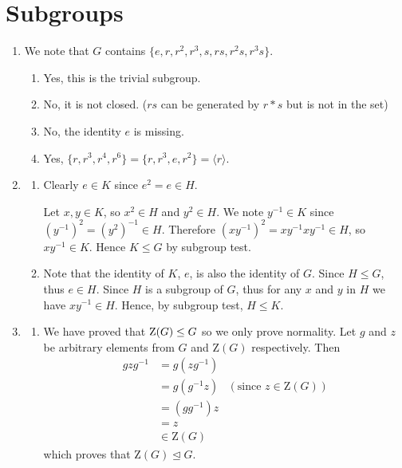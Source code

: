 \section{Subgroups}
\begin{enumerate}
    \item We note that $G$ contains $\{e, r, r^2, r^3, s, rs, r^2s, r^3s\}$.
    \begin{enumerate}[label=(\alph*)]
        \item Yes, this is the trivial subgroup.
        \item No, it is not closed. ($rs$ can be generated by $r \ast s$ but is not in the set)
        \item No, the identity $e$ is missing.
        \item Yes, $\{r, r^3, r^4, r^6\} = \{r, r^3, e, r^2\} = \langle r \rangle$.
    \end{enumerate}

    \item \begin{enumerate}[label=(\alph*)]
        \item Clearly $e \in K$ since $e^2 = e \in H$.
        
        Let $x, y \in K$, so $x^2 \in H$ and $y^2 \in H$. We note $y^{-1} \in K$ since $(y^{-1})^2 = (y^2)^{-1} \in H$. Therefore $(xy^{-1})^2 = xy^{-1}xy^{-1} \in H$, so $xy^{-1} \in K$. Hence $K \leq G$ by subgroup test.

        \item Note that the identity of $K$, $e$, is also the identity of $G$. Since $H \leq G$, thus $e \in H$. Since $H$ is a subgroup of $G$, thus for any $x$ and $y$ in $H$ we have $xy^{-1} \in H$. Hence, by subgroup test, $H \leq K$.
    \end{enumerate}

    \item \begin{enumerate}[label=(\alph*)]
        \item We have proved that $\mathrm{Z}(G) \leq G$ so we only prove normality. Let $g$ and $z$ be arbitrary elements from $G$ and $\mathrm{Z}(G)$ respectively. Then
        \begin{align*}
            gzg^{-1} &= g(zg^{-1})\\
            &= g(g^{-1}z) & (\text{since }z \in \mathrm{Z}(G))\\
            &= (gg^{-1})z \\
            &= z\\
            &\in \mathrm{Z}(G)
        \end{align*}
        which proves that $\mathrm{Z}(G) \unlhd G$.


\end{enumerate}
\end{enumerate}
